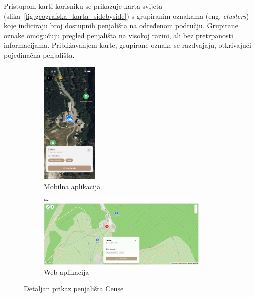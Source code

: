 Pristupom karti korisniku se prikazuje karta svijeta (slika~\ref{fig:geografska_karta_sidebyside}) s grupiranim oznakama (eng. \textit{clusters}) koje indiciraju broj dostupnih penjališta na određenom području. Grupirane oznake omogućuju pregled penjališta na visokoj razini, ali bez pretrpanosti informacijama. Približavanjem karte, grupirane oznake se razdvajaju, otkrivajući pojedinačna penjališta.

\begin{figure}[H]
    \centering
    \begin{subfigure}[b]{\textwidth}
        \centering
        \includegraphics[width=0.3\textwidth]{images/implementacija/geo_karta_ceuse.png}
        \caption{Mobilna aplikacija}
        \label{fig:geografska_karta_ceuse_mob}
    \end{subfigure}
    \hfill
    \begin{subfigure}[b]{\textwidth}
        \centering
        \includegraphics[width=0.9\textwidth]{images/implementacija/web/map_selected.png}
        \caption{Web aplikacija}
        \label{fig:geografska_karta_ceuse_web}
    \end{subfigure}
    \caption{Detaljan prikaz penjališta Ceuse}
    \label{fig:geografska_karta_ceuse_sidebyside}
\end{figure}

